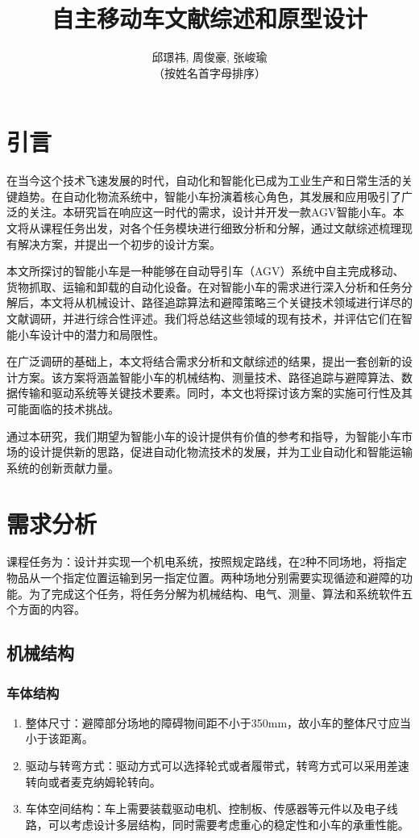 \documentclass{report}
\title{自主移动车文献综述和原型设计}
\author{邱璟祎, 周俊豪, 张峻瑜\\
  （按姓名首字母排序）
}
\begin{document}
\maketitle
\tableofcontents
\newpage
\chapter{引言}

在当今这个技术飞速发展的时代，自动化和智能化已成为工业生产和日常生活的关键趋势。在自动化物流系统中，智能小车扮演着核心角色，其发展和应用吸引了广泛的关注。本研究旨在响应这一时代的需求，设计并开发一款AGV智能小车。本文将从课程任务出发，对各个任务模块进行细致分析和分解，通过文献综述梳理现有解决方案，并提出一个初步的设计方案。

本文所探讨的智能小车是一种能够在自动导引车（AGV）系统中自主完成移动、货物抓取、运输和卸载的自动化设备。在对智能小车的需求进行深入分析和任务分解后，本文将从机械设计、路径追踪算法和避障策略三个关键技术领域进行详尽的文献调研，并进行综合性评述。我们将总结这些领域的现有技术，并评估它们在智能小车设计中的潜力和局限性。

在广泛调研的基础上，本文将结合需求分析和文献综述的结果，提出一套创新的设计方案。该方案将涵盖智能小车的机械结构、测量技术、路径追踪与避障算法、数据传输和驱动系统等关键技术要素。同时，本文也将探讨该方案的实施可行性及其可能面临的技术挑战。

通过本研究，我们期望为智能小车的设计提供有价值的参考和指导，为智能小车市场的设计提供新的思路，促进自动化物流技术的发展，并为工业自动化和智能运输系统的创新贡献力量。



\chapter{需求分析}
课程任务为：设计并实现一个机电系统，按照规定路线，在2种不同场地，将指定物品从一个指定位置运输到另一指定位置。两种场地分别需要实现循迹和避障的功能。为了完成这个任务，将任务分解为机械结构、电气、测量、算法和系统软件五个方面的内容。
\section{机械结构}
\label{sec:label}
\subsection{车体结构}
\label{subsec:label}
\begin{enumerate}
\item 整体尺寸：避障部分场地的障碍物间距不小于350mm，故小车的整体尺寸应当小于该距离。
\item 驱动与转弯方式：驱动方式可以选择轮式或者履带式，转弯方式可以采用差速转向或者麦克纳姆轮转向。
  \item 车体空间结构：车上需要装载驱动电机、控制板、传感器等元件以及电子线路，可以考虑设计多层结构，同时需要考虑重心的稳定性和小车的承重性能。
\end{enumerate}
\end{document}

